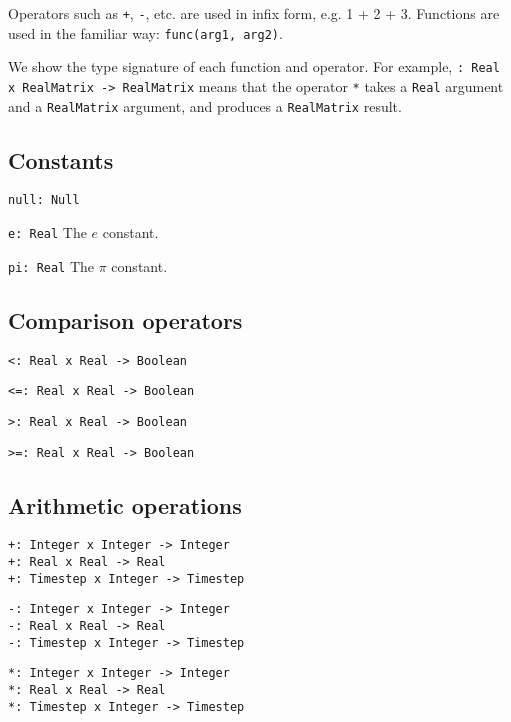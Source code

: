 Operators such as \verb|+|, \verb|-|, etc. are used in infix form, e.g. 1 + 2 +
3. Functions are used in the familiar way: \verb|func(arg1, arg2)|.

We show the type signature of each function and operator. For example, {\tt *:
Real x RealMatrix -> RealMatrix} means that the operator \verb|*| takes a
\verb|Real| argument and a \verb|RealMatrix| argument, and produces a
\verb|RealMatrix| result.


\subsection{Constants}
\label{sec:builtin-constants}

\verb|null: Null| 

\verb|e: Real| The $e$ constant.

\verb|pi: Real| The $\pi$ constant.


\subsection{Comparison operators}
\label{sec:builtin-comparison}

\verb|<: Real x Real -> Boolean|

\verb|<=: Real x Real -> Boolean|

\verb|>: Real x Real -> Boolean|

\verb|>=: Real x Real -> Boolean|



\subsection{Arithmetic operations}
\label{sec:builtin-arithmetic}

\verb|+: Integer x Integer -> Integer| \\
\verb|+: Real x Real -> Real| \\
\verb|+: Timestep x Integer -> Timestep|

\verb|-: Integer x Integer -> Integer| \\
\verb|-: Real x Real -> Real| \\
\verb|-: Timestep x Integer -> Timestep|

\verb|*: Integer x Integer -> Integer| \\
\verb|*: Real x Real -> Real| \\
\verb|*: Timestep x Integer -> Timestep|

